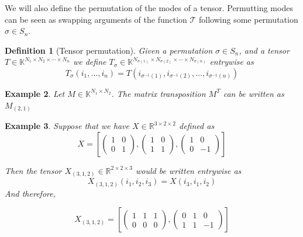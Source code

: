 \documentclass[11pt,a4paper,openright,oneside]{book}
\numberwithin{equation}{section}
\newtheorem{defn0}{Definition}[chapter]
\newtheorem{example0}[defn0]{Example}
\newenvironment{definition}{ \begin{defn0}}{\end{defn0}}
\newenvironment{example}{ \begin{example0}\rm}{\end{example0}}
\begin{document}
We will also define the permutation of the modes of a tensor. Permutting modes can be seen as swapping arguments of the function $\mathcal{T}$
following some permutation $\sigma \in S_n$.

\begin{definition}[Tensor permutation]
    Given a permutation $\sigma \in S_n$, and a tensor $T \in \mathbb{K}^{N_1 \times N_2 \times \cdots \times N_n}$ we define
    $T_\sigma \in \mathbb{K}^{N_{\sigma(1)} \times N_{\sigma(2)} \times \cdots \times N_{\sigma(n)}}$ entrywise as
    $$T_\sigma (i_1, \dots, i_n) = T(i_{\sigma^{-1}(1)}, i_{\sigma^{-1}(2)}, \dots, i_{\sigma^{-1}(n)})$$
\end{definition}

\begin{example}
    Let $M \in \mathbb{K}^{N_1 \times N_2}$. The matrix transposition $M^T$ can be written as $M_{(2, 1)}$ 
\end{example}

\begin{example}
    Suppose that we have $X \in \mathbb{R}^{3 \times 2 \times 2}$ defined as
    $$X = \left[\begin{pmatrix}
            1 & 0 \\
            0 & 1
        \end{pmatrix}, 
        \begin{pmatrix}
            1 & 0 \\
            1 & 1
        \end{pmatrix},
        \begin{pmatrix}
            1 & 0 \\
            0 & -1
        \end{pmatrix}
        \right]$$

        Then the tensor $X_{(3, 1, 2)} \in \mathbb{R}^{2 \times 2 \times 3}$ would be written entrywise as
        $$X_{(3, 1, 2)}(i_1, i_2, i_3) = X(i_3, i_1, i_2)$$
        And therefore,

        $$X_{(3,1,2)} = \left[\begin{pmatrix} 1 & 1 & 1 \\ 0 & 0 & 0  \end{pmatrix}, \begin{pmatrix}  0 & 1 & 0 \\ 1 & 1 & -1 \end{pmatrix} \right]$$ 


    \label{ex:perm}
\end{example}
\end{document}
